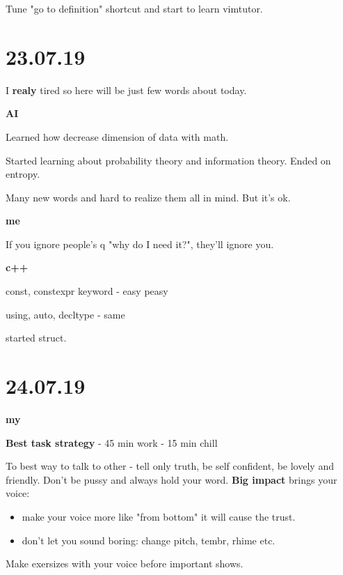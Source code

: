 \documentclass[12pt,a4paper,titlepage]{article}
\begin{document}
Tune "go to definition" shortcut and start to learn vimtutor.

\newpage
\section{23.07.19}

I \textbf{realy} tired so here will be just few words about today.
\begin{center}
    \large \textbf{AI}
\end{center}

Learned how decrease dimension of data with math.

Started learning about probability theory and information theory. Ended on entropy.

Many new words and hard to realize them all in mind. But it's ok.

\begin{center}
    \large \textbf{me}
\end{center}

If you ignore people's q "why do I need it?", they'll ignore you.

\begin{center}
    \large \textbf{c++}
\end{center}

const, constexpr keyword - easy peasy

using, auto, decltype - same

started struct.

\newpage
\section{24.07.19}
\begin{center}
    \large \textbf{my}
\end{center}

\textbf{Best task strategy} - 45 min work - 15 min chill 

To best way to talk to other - tell only truth, be self confident, be lovely and friendly. Don't
be pussy and always hold your word. \textbf{Big impact} brings your voice:
\begin{itemize}
    \item make your voice more like "from bottom" it will cause the trust.
    \item don't let you sound boring: change pitch, tembr, rhime etc.
\end{itemize}

Make exersizes with your voice before important shows.
\end{document}

